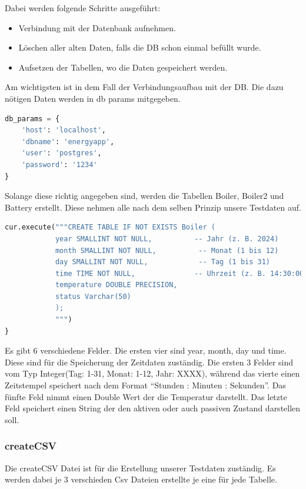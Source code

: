 \documentclass[11pt]{scrartcl}
\begin{document}
Dabei werden folgende Schritte ausgeführt:
\begin{itemize}[noitemsep, topsep=0pt]
    \item Verbindung mit der Datenbank aufnehmen.
    \item Löschen aller alten Daten, falls die DB schon einmal befüllt wurde.
    \item Aufsetzen der Tabellen, wo die Daten gespeichert werden.
\end{itemize}

\newpage

Am wichtigsten ist in dem Fall der Verbindungsaufbau mit der DB. Die dazu nötigen Daten werden in db params mitgegeben.

\begin{lstlisting}[language=Python]
db_params = {
    'host': 'localhost',
    'dbname': 'energyapp',
    'user': 'postgres',
    'password': '1234'
}
\end{lstlisting}

Solange diese richtig angegeben sind, werden die Tabellen Boiler, Boiler2 und Battery erstellt. Diese nehmen alle nach dem selben Prinzip unsere Testdaten auf. 

\begin{lstlisting}[language=Python]
cur.execute("""CREATE TABLE IF NOT EXISTS Boiler (
            year SMALLINT NOT NULL,          -- Jahr (z. B. 2024)
            month SMALLINT NOT NULL,          -- Monat (1 bis 12)
            day SMALLINT NOT NULL,            -- Tag (1 bis 31)
            time TIME NOT NULL,              -- Uhrzeit (z. B. 14:30:00)
            temperature DOUBLE PRECISION,
            status Varchar(50)
            );
            """)
}
\end{lstlisting}

Es gibt 6 verschiedene Felder. Die ersten vier sind year, month, day und time. Diese sind für die Speicherung der Zeitdaten zuständig. Die ersten 3 Felder sind vom Typ Integer(Tag: 1-31, Monat: 1-12, Jahr: XXXX), während das vierte einen Zeitstempel speichert nach dem Format \enquote{Stunden : Minuten : Sekunden}. Das fünfte Feld nimmt einen Double Wert der die Temperatur darstellt. Das letzte Feld speichert einen String der den aktiven oder auch passiven Zustand darstellen soll. 

\subsubsection*{createCSV} 

Die createCSV Datei ist für die Erstellung unserer Testdaten zuständig. Es werden dabei je 3 verschieden Csv Dateien erstellte je eine für jede Tabelle. 
\end{document}
